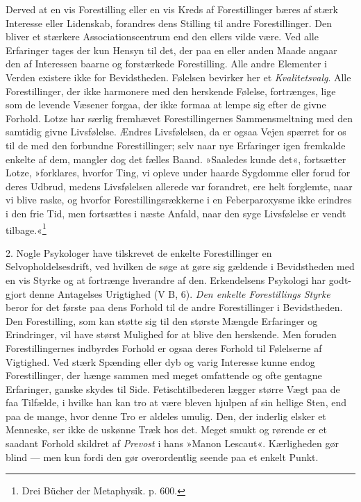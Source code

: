 \documentclass[12pt,a4paper,openany]{book}
\newcommand{\opage}[1]{\marginnote{\footnotesize\textit{[#1]}}}
\begin{document}
Derved at en vis Forestilling eller en vis Kreds af Forestillinger bæres
af stærk Interesse eller Lidenskab, forandres dens Stilling til andre
Forestillinger. Den bliver et stærkere Associationscentrum end den
ellers vilde være. Ved alle Erfaringer tages der kun Hensyn til det, der
paa en eller anden Maade angaar den af Interessen baarne og forstærkede
Forestilling. Alle andre Elementer i Verden existere ikke for
Bevidstheden. Følelsen bevirker her et \emph{Kvalitetsvalg}. Alle
Forestillinger, der ikke harmonere med den herskende Følelse,
fortrænges, lige som de levende Væsener forgaa, der ikke formaa at lempe
sig efter de givne Forhold. Lotze har særlig fremhævet Forestillingernes
Sammensmeltning med den samtidig givne Livsfølelse. Ændres Livsfølelsen,
da er ogsaa Vejen spærret for os til de med den forbundne
Forestillinger; selv naar nye Erfaringer igen fremkalde enkelte af dem,
mangler dog det fælles Baand. »Saaledes kunde det«, fortsætter Lotze,
»forklares, hvorfor Ting, vi opleve under haarde Sygdomme eller forud
for deres Udbrud, medens Livsfølelsen allerede var forandret, ere helt
forglemte, naar vi blive raske, og hvorfor Forestillingsrækkerne i en
Feberparoxysme ikke erindres i den frie Tid, men fortsættes i næste
Anfald, naar den syge Livsfølelse er vendt tilbage.«\footnote[1]{Drei
Bücher der Metaphysik. p. 600.}

2. Nogle Psykologer have tilskrevet de enkelte Forestillinger en
Selvopholdelsesdrift, ved hvilken de søge at gøre sig gældende i
Bevidstheden med en vis Styrke og at fortrænge hverandre af den.
Erkendelsens Psykologi har godt-gjort denne Antagelses Urigtighed (V B,
6). \emph{Den enkelte Forestillings Styrke} beror for det første paa
dens Forhold
\opage{354}til de andre Forestillinger i Bevidstheden. Den Forestilling,
som kan støtte sig til den største Mængde Erfaringer og Erindringer, vil
have størst Mulighed for at blive den herskende. Men foruden
Forestillingernes indbyrdes Forhold er ogsaa deres Forhold til
Følelserne af Vigtighed. Ved stærk Spænding eller dyb og varig Interesse
kunne endog Forestillinger, der hænge sammen med meget omfattende og
ofte gentagne Erfaringer, ganske skydes til Side. Fetischtilbederen
lægger større Vægt paa de faa Tilfælde, i hvilke han kan tro at være
bleven hjulpen af sin hellige Sten, end paa de mange, hvor denne Tro er
aldeles umulig. Den, der inderlig elsker et Menneske, ser ikke de
uskønne Træk hos det. Meget smukt og rørende er et saadant Forhold
skildret af \emph{Prevost} i hans »Manon Lescaut«. Kærligheden gør blind
--- men kun fordi den gør overordentlig seende paa et enkelt Punkt.
\end{document}
